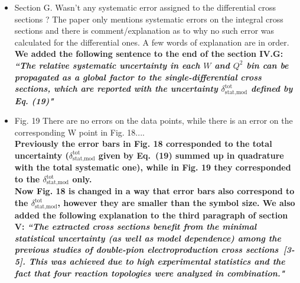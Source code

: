 \documentclass[,superscriptaddress,showpacs,amssymb,amsmath,amsfonts,linenumbers,article]{revtex4-1}
\begin{document}
\begin{itemize}
\item Section G. Wasn't any systematic error assigned to the differential cross sections ? The paper only mentions systematic errors on the integral cross sections and there is comment/explanation as to why no such error was calculated for the differential ones. A few words of explanation are in order.\\
{\bf We added the following sentence to the end of the section IV.G:\\
\textbf{\textit{``The relative systematic uncertainty in each $W$ and $Q^{2}$ bin can be propagated as a global factor to the single-differential cross sections, which are reported with the uncertainty $\delta_{\text{stat,mod}}^{\text{tot}}$ defined by Eq. (19)"}}\\
}
 



\item Fig. 19 There are no errors on the data points, while there is an error on the corresponding W point in Fig. 18....\\
{\bf Previously the error bars in Fig. 18 corresponded to the total uncertainty ($\delta^{\text{tot}}_{\text{stat,mod}}$ given by Eq.~(19) summed up in quadrature with the total systematic one), while in Fig. 19 they corresponded to the $\delta^{\text{tot}}_{\text{stat,mod}}$ only.\\
Now Fig. 18 is changed in a way that error bars also correspond to the $\delta^{\text{tot}}_{\text{stat,mod}}$, however they are smaller than the symbol size. We also added the following explanation to the third paragraph of section V: 
\textbf{\textit{``The extracted cross sections benefit from the minimal statistical uncertainty (as well as model dependence) among the previous studies of double-pion electroproduction cross sections~[3-5]. This was achieved due to high experimental statistics and the fact that four reaction topologies were  analyzed in combination."}}
}


\end{itemize}
\end{document}
